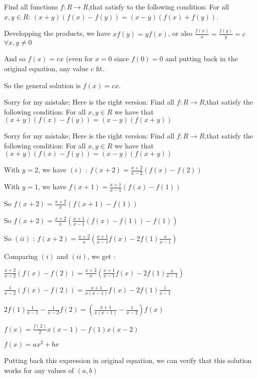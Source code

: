 \begin{mysolution}
	\begin{tcolorbox}Find all functions $ f: R\rightarrow R$,that satisfy to the following condition:
For all $ x,y\in R$: $ (x+y)(f(x)-f(y))=(x-y)(f(x)+f(y))$.\end{tcolorbox}

Developping the products, we have $ xf(y)=yf(x)$, or also $ \frac{f(x)}{x}=\frac{f(y)}{y}=c$ $ \forall x,y\neq 0$

And so $ f(x)=cx$ (even for $ x=0$ since $ f(0)=0$
and putting back in the original equation, any value $ c$ fit.

So the general solution is $ f(x)=cx$.
\end{mysolution}



\begin{mysolution}
	Sorry for my mistake;
Here is the right version:
Find all $ f: R\rightarrow R$,that satisfy the following condition:
For all $ x,y\in R$ we have that $ (x+y)(f(x)-f(y))=(x-y)(f(x+y))$
\end{mysolution}



\begin{mysolution}
	\begin{tcolorbox}Sorry for my mistake;
Here is the right version:
Find all $ f: R\rightarrow R$,that satisfy the following condition:
For all $ x,y\in R$ we have that $ (x+y)(f(x)-f(y))=(x-y)(f(x+y))$\end{tcolorbox}

With $ y=2$, we have $ (i)$ : $ f(x+2)=\frac{x+2}{x-2}(f(x)-f(2))$

With $ y=1$, we have $ f(x+1)=\frac{x+1}{x-1}(f(x)-f(1))$

So $ f(x+2)=\frac{x+2}{x}(f(x+1)-f(1))$

So $ f(x+2)=\frac{x+2}{x}(\frac{x+1}{x-1}(f(x)-f(1))-f(1))$

So $ (ii)$ : $ f(x+2)=\frac{x+2}{x}(\frac{x+1}{x-1}f(x)-2f(1)\frac{x}{x-1})$


Comparing $ (i)$ and $ (ii)$, we get :

$ \frac{x+2}{x-2}(f(x)-f(2))=\frac{x+2}{x}(\frac{x+1}{x-1}f(x)-2f(1)\frac{x}{x-1})$

$ \frac{1}{x-2}(f(x)-f(2))=\frac{x+1}{x(x-1)}f(x)-2f(1)\frac{1}{x-1}$

$ 2f(1)\frac{1}{x-1}-\frac{1}{x-2}f(2)=(\frac{x+1}{x(x-1)}-\frac{1}{x-2})f(x)$

$ f(x)=\frac{f(2)}{2}x(x-1)-f(1)x(x-2)$

$ f(x)=ax^{2}+bx$

Putting back this expression in original equation, we can verify that this solution works for any values of $ (a,b)$
\end{mysolution}



